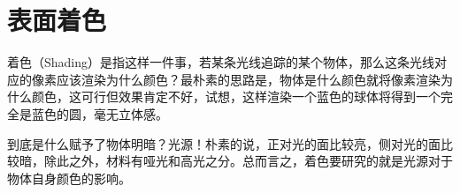 \chapter{表面着色}
着色（Shading）是指这样一件事，若某条光线追踪的某个物体，那么这条光线对应的像素应该渲染为什么颜色？最朴素的思路是，物体是什么颜色就将像素渲染为什么颜色，这可行但效果肯定不好，试想，这样渲染一个蓝色的球体将得到一个完全是蓝色的圆，毫无立体感。

到底是什么赋予了物体明暗？光源！朴素的说，正对光的面比较亮，侧对光的面比较暗，除此之外，材料有哑光和高光之分。总而言之，着色要研究的就是光源对于物体自身颜色的影响。




